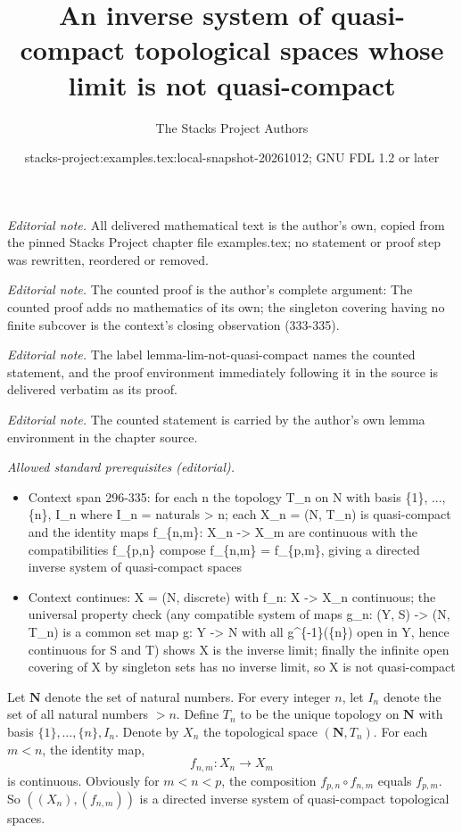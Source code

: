 \documentclass[10pt,a4paper]{amsart}
\title{An inverse system of quasi-compact topological spaces whose limit is not quasi-compact}
\author{The Stacks Project Authors}
\date{stacks-project:examples.tex:local-snapshot-20261012; GNU FDL 1.2 or later}
\theoremstyle{plain}
\theoremstyle{definition}
\theoremstyle{remark}
\numberwithin{equation}{subsection}
\begin{document}
\maketitle
\noindent\textit{Editorial note.} All delivered mathematical text is the author's own, copied from the pinned Stacks Project chapter file examples.tex; no statement or proof step was rewritten, reordered or removed.\par\medskip
\noindent\textit{Editorial note.} The counted proof is the author's complete argument: The counted proof adds no mathematics of its own; the singleton covering having no finite subcover is the context's closing observation (333-335).\par\medskip
\noindent\textit{Editorial note.} The label lemma-lim-not-quasi-compact names the counted statement, and the proof environment immediately following it in the source is delivered verbatim as its proof.\par\medskip
\noindent\textit{Editorial note.} The counted statement is carried by the author's own lemma environment in the chapter source.\par\medskip
\noindent\textit{Allowed standard prerequisites (editorial).}\begin{itemize}
\item Context span 296-335: for each n the topology T\_n on N with basis \{1\}, ..., \{n\}, I\_n where I\_n = naturals > n; each X\_n = (N, T\_n) is quasi-compact and the identity maps f\_\{n,m\}: X\_n -> X\_m are continuous with the compatibilities f\_\{p,n\} compose f\_\{n,m\} = f\_\{p,m\}, giving a directed inverse system of quasi-compact spaces
\item Context continues: X = (N, discrete) with f\_n: X -> X\_n continuous; the universal property check (any compatible system of maps g\_n: (Y, S) -> (N, T\_n) is a common set map g: Y -> N with all g\textasciicircum{}\{-1\}(\{n\}) open in Y, hence continuous for S and T) shows X is the inverse limit; finally the infinite open covering of X by singleton sets has no inverse limit, so X is not quasi-compact
\end{itemize}\medskip
Let $\mathbf{N}$ denote the set of natural numbers.
For every integer $n$, let $I_n$ denote the set of all natural numbers $> n$.
Define $T_n$ to be the unique topology on $\mathbf{N}$ with basis
$\{1\}, \ldots , \{n\}, I_n$.  Denote by $X_n$ the topological space
$(\mathbf{N}, T_n)$.  For each $m < n$, the identity map,
$$
f_{n, m} : X_n \longrightarrow X_m
$$
is continuous.  Obviously for $m < n < p$, the composition
$f_{p, n} \circ f_{n, m}$ equals $f_{p, m}$.  So $((X_n), (f_{n,m}))$
is a directed inverse system of quasi-compact topological spaces.
\end{document}
